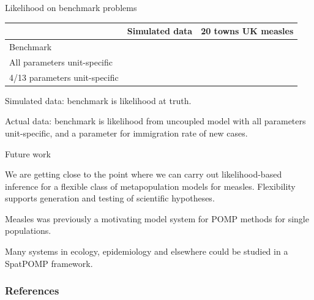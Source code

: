 \documentclass{beamer}
\begin{document}
\begin{frame}{Likelihood on benchmark problems}

\begin{tabular}{l|rr}
  &   Simulated data & 20 towns UK measles \\
  \hline
Benchmark & & \\
All parameters unit-specific & & \\
4/13 parameters unit-specific & & \\
\end{tabular}

\vspace{8mm}
\bi
\item Simulated data: benchmark is likelihood at truth.
\item Actual data: benchmark is likelihood from uncoupled model with all parameters unit-specific, and a parameter for immigration rate of new cases.
  \ei

  \end{frame}


\begin{frame}{Future work}

  \newcommand\futuresep{\vspace{3mm}}
  
  \begin{myitemize}
  \item We are getting close to the point where we can carry out likelihood-based inference for a flexible class of metapopulation models for measles.
Flexibility supports generation and testing of scientific hypotheses.
        
    \futuresep
    
  \item Measles was previously a motivating model system for POMP methods for single populations.

    \futuresep
    
    \item Many systems in ecology, epidemiology and elsewhere could be studied in a SpatPOMP framework.
    
\end{myitemize}

\end{frame}

\nocite{bjornstad01,grenfell04,breto19,rebeschini15,ng02,ionides21}

\begin{frame}[allowframebreaks]
\frametitle{References}


\end{frame}
\end{document}
